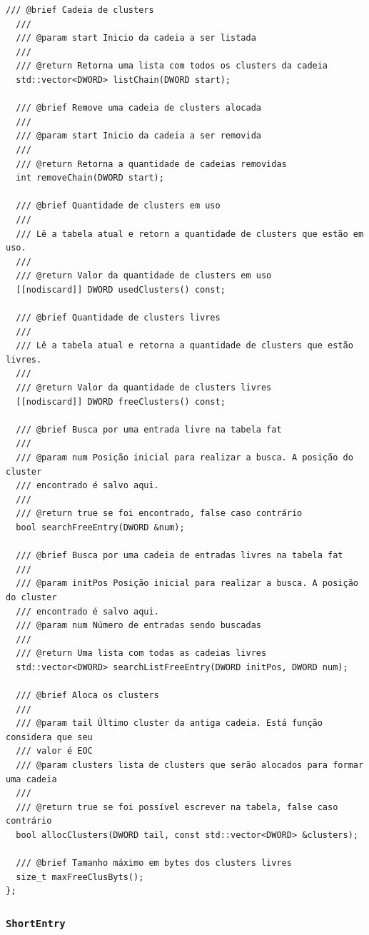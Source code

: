 \documentclass[
    12pt,				%
    oneside,   	        %
    a4paper,			%
    english,			%
    french,				%
    spanish,			%
    brazil,				%
    ]{pacotes/abntex2}
\begin{document}
\begin{lstlisting}[caption={Classe a estrutura FAT}, label={lst:fat_table}]
  /// @brief Cadeia de clusters
  ///
  /// @param start Inicio da cadeia a ser listada
  ///
  /// @return Retorna uma lista com todos os clusters da cadeia
  std::vector<DWORD> listChain(DWORD start);

  /// @brief Remove uma cadeia de clusters alocada
  ///
  /// @param start Inicio da cadeia a ser removida
  ///
  /// @return Retorna a quantidade de cadeias removidas
  int removeChain(DWORD start);

  /// @brief Quantidade de clusters em uso
  ///
  /// Lê a tabela atual e retorn a quantidade de clusters que estão em uso.
  ///
  /// @return Valor da quantidade de clusters em uso
  [[nodiscard]] DWORD usedClusters() const;

  /// @brief Quantidade de clusters livres
  ///
  /// Lê a tabela atual e retorna a quantidade de clusters que estão livres.
  ///
  /// @return Valor da quantidade de clusters livres
  [[nodiscard]] DWORD freeClusters() const;

  /// @brief Busca por uma entrada livre na tabela fat
  ///
  /// @param num Posição inicial para realizar a busca. A posição do cluster
  /// encontrado é salvo aqui.
  ///
  /// @return true se foi encontrado, false caso contrário
  bool searchFreeEntry(DWORD &num);

  /// @brief Busca por uma cadeia de entradas livres na tabela fat
  ///
  /// @param initPos Posição inicial para realizar a busca. A posição do cluster
  /// encontrado é salvo aqui.
  /// @param num Número de entradas sendo buscadas
  ///
  /// @return Uma lista com todas as cadeias livres
  std::vector<DWORD> searchListFreeEntry(DWORD initPos, DWORD num);

  /// @brief Aloca os clusters
  ///
  /// @param tail Último cluster da antiga cadeia. Está função considera que seu
  /// valor é EOC
  /// @param clusters lista de clusters que serão alocados para formar uma cadeia
  ///
  /// @return true se foi possível escrever na tabela, false caso contrário
  bool allocClusters(DWORD tail, const std::vector<DWORD> &clusters);

  /// @brief Tamanho máximo em bytes dos clusters livres
  size_t maxFreeClusByts();
};
\end{lstlisting}

\subsubsection{\texttt{ShortEntry}}
\label{subsubsec:short_entry}
\end{document}
